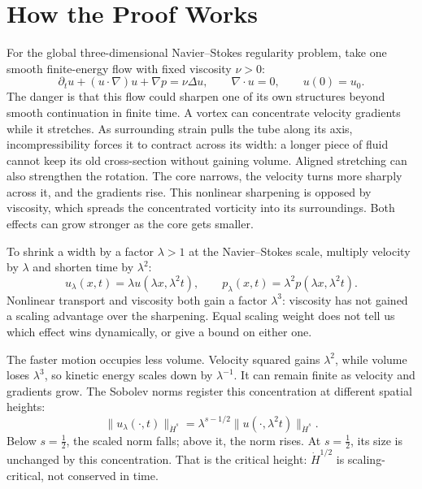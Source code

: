 \begingroup
\setlength{\parindent}{0pt}
\setlength{\parskip}{0.40\baselineskip}
\setlength{\abovedisplayskip}{6.5pt plus 1.5pt minus 1.5pt}
\setlength{\belowdisplayskip}{6.5pt plus 1.5pt minus 1.5pt}
\setlength{\jot}{4.5pt}

\section*{How the Proof Works}

For the global three-dimensional Navier--Stokes regularity problem, take one
smooth finite-energy flow with fixed viscosity \(\nu>0\):
\[
 \partial_tu+(u\!\cdot\nabla)u+\nabla p=\nu\Delta u,
 \qquad \nabla\!\cdot u=0,
 \qquad u(0)=u_0.
\]
The danger is that this flow could sharpen one of its own structures beyond
smooth continuation in finite time.  A vortex can concentrate velocity
gradients while it stretches.
As surrounding strain pulls the tube along its axis, incompressibility forces
it to contract across its width: a longer piece of fluid cannot keep its old
cross-section without gaining volume.  Aligned stretching can also strengthen
the rotation.  The core narrows, the velocity turns more sharply across it,
and the gradients rise.  This nonlinear sharpening is opposed by viscosity,
which spreads the concentrated vorticity into its surroundings.  Both effects
can grow stronger as the core gets smaller.

To shrink a width by a factor \(\lambda>1\) at the Navier--Stokes scale,
multiply velocity by \(\lambda\) and shorten time by \(\lambda^2\):
\[
 u_\lambda(x,t)=\lambda u(\lambda x,\lambda^2t),
 \qquad
 p_\lambda(x,t)=\lambda^2p(\lambda x,\lambda^2t).
\]
Nonlinear transport and viscosity both gain a factor \(\lambda^3\): viscosity
has not gained a scaling advantage over the sharpening.  Equal scaling weight
does not tell us which effect wins dynamically, or give a bound on either one.

The faster motion occupies less volume.  Velocity squared gains
\(\lambda^2\), while volume loses \(\lambda^3\), so kinetic energy scales down
by \(\lambda^{-1}\).  It can remain finite as velocity and gradients grow.
The Sobolev norms register this concentration at different spatial heights:
\[
 \|u_\lambda(\cdot,t)\|_{\dot H^s}
 =\lambda^{s-1/2}
  \|u(\cdot,\lambda^2t)\|_{\dot H^s}.
\]
Below \(s=\tfrac12\), the scaled norm falls; above it, the norm rises.  At
\(s=\tfrac12\), its size is unchanged by this concentration.  That is the
critical height: \(\dot H^{1/2}\) is scaling-critical, not conserved in time.

